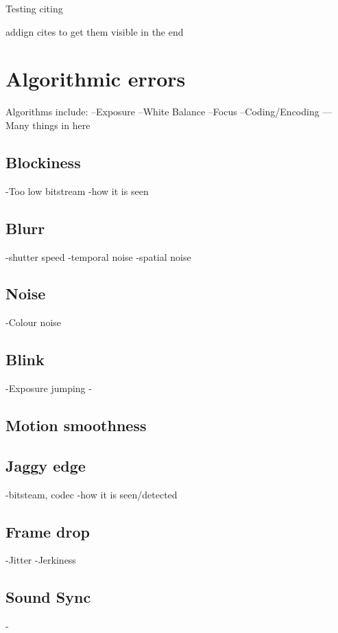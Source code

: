 

Testing citing ~\cite{4799375}

addign cites to get them visible in the end
~\cite{5464831}
~\cite{5583037}
~\cite{5583094}
~\cite{5710601}
~\cite{5739529}
~\cite{6081486}
~\cite{6116319}
~\cite{6411890}
~\cite{6467556}
~\cite{6625056}
~\cite{6705673}
~\cite{5605523}
~\cite{5290984}
~\cite{1203346}
~\cite{4803123}
~\cite{4799318}
~\cite{5381595}
~\cite{6229729}
~\cite{4347144}
~\cite{1247211}



\section{Algorithmic errors}
Algorithms include:
--Exposure
--White Balance
--Focus
--Coding/Encoding
---Many things in here

\subsection{Blockiness}
-Too low bitstream
-how it is seen

\subsection{Blurr}
-shutter speed
-temporal noise
-spatial noise
\subsection{Noise}
-Colour noise

\subsection{Blink}
-Exposure jumping
-
\subsection{Motion smoothness}
\subsection{Jaggy edge}
-bitsteam, codec
-how it is seen/detected
\subsection{Frame drop}
-Jitter
-Jerkiness
\subsection{Sound Sync}
-
